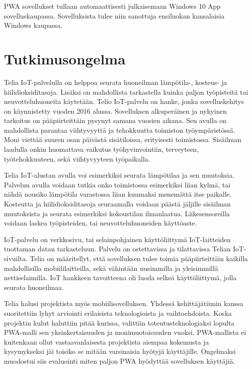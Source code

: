 \documentclass{tktltiki}
\begin{document}
PWA sovellukset tullaan automaattisesti julkaisemaan Windows 10 App sovelluskaupassa. \cite{Rossi} Sovelluksista tulee niin sanottuja ensiluokan kansalaisia Windows kaupassa. 

\newpage
\section{Tutkimusongelma}

Telia IoT-palvelulla on helppoa seurata huoneilman lämpötila-, kosteus- ja hiilidioksiditasoja. Lisäksi on mahdollista tarkastella kuinka paljon työpisteitä tai neuvotteluhuoneita käytetään. Telio IoT-palvelu on hanke, jonka sovelluskehitys on käynnistetty vuoden 2016 alussa. Sovelluksen alkuperäinen ja nykyinen tarkoitus on pääpiirteittäin pysynyt samana vuosien aikana. Sen avulla on mahdollista parantaa viihtyvyyttä ja tehokkuutta toimiston työympäristössä. Moni viettää suuren osan päivästä sisätiloissa, erityisesti toimistossa. Sisäilman laadulla onkin huomattava vaikutus työhyvinvointiin, terveyteen, työtehokkuuteen, sekä viihtyvyyteen työpaikalla. 

Telia IoT-alustan avulla voi esimerkiksi seurata lämpötilaa ja sen muutoksia. Palvelun avulla voidaan tutkia onko toimistossa esimerkiksi liian kylmä, tai nähdä nousiko lämpötila varastossa liian kuumaksi menemättä itse paikalle. Kosteutta ja hiilidioksiditasoja seuraamalla voidaan päästä jäljille sisäilman muutoksista ja seurata esimerkiksi kokoustilan ilmanlaatua. Liikesensoreilla voidaan laskea työpisteiden, tai neuvotteluhuoneiden käyttöaste. 

IoT-palvelu on verkkosivu, tai selainpohjainen käyttöliittymä IoT-laitteiden tuottaman datan tarkasteluun. Palvelu on ostettavissa ja tilattavissa Telian IoT-sivuilta. Telia on määritellyt, että sovelluksen tulee toimia pääpiirteittäin kaikilla mahdollisilla mobiililaitteilla, sekä vähintään uusimmilla ja yleisimmillä nettiselaimilla. IoT hankkeen tavoitteena oli luoda selkeä käyttöliittymä, jolla seurata huoneilmaa. 

Telia halusi projektista myös mobiilisovelluksen. Yhdessä kehittäjätiimin kanssa suoritettiin lyhyt arviointi erilaisista teknologioista ja vaihtoehdoista. Koska projektin kulut haluttiin pitää kurissa, valittiin toteutusteknologiaksi lopulta PWA-malli sen yksinkertaisuuden ja monimuotoisuuden vuoksi. PWA-mallista ei kuitenkaan ollut vastaavanlaisesta projektista aiempaa kokemusta ja kysymykseksi jäi toisiko se mitään varsinaisia hyötyjä käyttäjille. Ongelmaksi muodostui siis evaluointi miten paljon PWA hyödyttää sovelluksen käyttäjiä.
\end{document}
